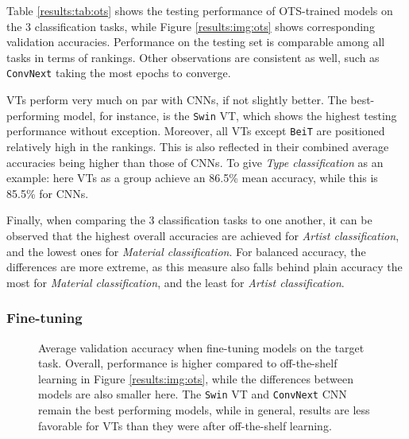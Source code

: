Table \ref{results:tab:ots} shows the testing performance of OTS-trained models on the 3 classification tasks, while Figure \ref{results:img:ots} shows corresponding validation accuracies. Performance on the testing set is comparable among all tasks in terms of rankings. Other observations are consistent as well, such as \texttt{ConvNext} taking the most epochs to converge.

VTs perform very much on par with CNNs, if not slightly better. The best-performing model, for instance, is the \texttt{Swin} VT, which shows the highest testing performance without exception. Moreover, all VTs except \texttt{BeiT} are positioned relatively high in the rankings. This is also reflected in their combined average accuracies being higher than those of CNNs. To give \textit{Type classification} as an example: here VTs as a group achieve an 86.5\% mean accuracy, while this is 85.5\% for CNNs.

Finally, when comparing the 3 classification tasks to one another, it can be observed that the highest overall accuracies are achieved for \textit{Artist classification}, and the lowest ones for \textit{Material classification}. For balanced accuracy, the differences are more extreme, as this measure also falls behind plain accuracy the most for \textit{Material classification}, and the least for \textit{Artist classification}.



\subsubsection{Fine-tuning} \label{results:ft}

\begin{figure}[tb]
    \centering
    \def\svgwidth{\textwidth}
    
    \caption{Average validation accuracy when fine-tuning models on the target task. Overall, performance is higher compared to off-the-shelf learning in Figure \ref{results:img:ots}, while the differences between models are also smaller here. The \texttt{Swin} VT and \texttt{ConvNext} CNN remain the best performing models, while in general, results are less favorable for VTs than they were after off-the-shelf learning.}
    \label{results:img:ft}
\end{figure}

